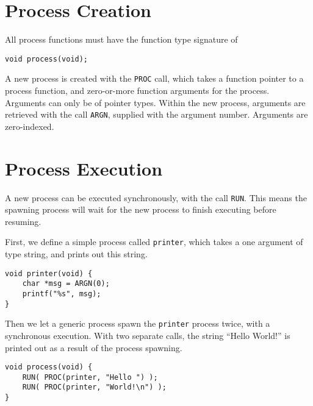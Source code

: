 \section*{Process Creation}
All process functions must have the function type signature of

\begin{lstlisting}[style={CustomC},frame={},numbers={none}]
void process(void);
\end{lstlisting}

A new process is created with the \texttt{PROC} call, which takes a function pointer to a process function, and zero\hyp{}or\hyp{}more function arguments for the process. Arguments can only be of pointer types. Within the new process, arguments are retrieved with the call \texttt{ARGN}, supplied with the argument number. Arguments are zero\hyp{}indexed. 

\section*{Process Execution}

A new process can be executed synchronously, with the call \texttt{RUN}. This means the spawning process will wait for the new process to finish executing before resuming.

First, we define a simple process called \texttt{printer}, which takes a one argument of type string, and prints out this string.

\noindent\begin{minipage}{\textwidth}
\begin{lstlisting}[style={CustomC},caption={Hello World with multiple processes}]
void printer(void) {
    char *msg = ARGN(0);
    printf("%s", msg);
}
\end{lstlisting}
\end{minipage}

Then we let a generic process spawn the \texttt{printer} process twice, with a synchronous execution. With two separate calls, the string ``Hello World!'' is printed out as a result of the process spawning. 

\noindent\begin{minipage}{\textwidth}
\begin{lstlisting}[style={CustomC},caption={Hello World with multiple processes}]
void process(void) {
    RUN( PROC(printer, "Hello ") );
    RUN( PROC(printer, "World!\n") );
}
\end{lstlisting}
\end{minipage}

